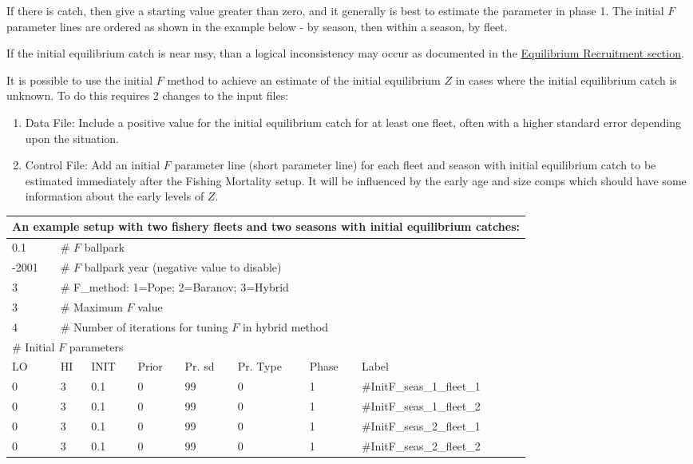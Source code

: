 If there is catch, then give a starting value greater than zero, and it generally is best to estimate the parameter in phase 1. The initial $F$ parameter lines are ordered as shown in the example below - by season, then within a season, by fleet.

If the initial equilibrium catch is near \gls{msy}, than a logical inconsistency may occur as documented in the \hyperlink{EquilRecr}{Equilibrium Recruitment section}. 

It is possible to use the initial $F$ method to achieve an estimate of the initial equilibrium $Z$ in cases where the initial equilibrium catch is unknown. To do this requires 2 changes to the input files:
\begin{enumerate}
	\item Data File: Include a positive value for the initial equilibrium catch for at least one fleet, often with a higher standard error depending upon the situation.
	\item Control File: Add an initial $F$ parameter line (short parameter line) for each fleet and season with initial equilibrium catch to be estimated immediately after the Fishing Mortality setup. It will be influenced by the early age and size comps which should have some information about the early levels of $Z$.
\end{enumerate}

\begin{longtable}{p{1.3cm} p{1cm} p{1cm} p{1cm} p{1.5cm} p{1.2cm} p{1cm} p{2.5cm}}
	\multicolumn{8}{l}{An example setup with two fishery fleets and two seasons with initial equilibrium catches:} \\
	\hline
	0.1 & \multicolumn{7}{l}{\# $F$ ballpark} \Tstrut\Bstrut\\
	\hline
	-2001 & \multicolumn{7}{l}{\# $F$ ballpark year (negative value to disable)} \Tstrut\Bstrut\\
	\hline
	3 & \multicolumn{7}{l}{\# F\_method: 1=Pope; 2=Baranov; 3=Hybrid} \Tstrut\Bstrut\\
	\hline
	3 & \multicolumn{7}{l}{\# Maximum $F$ value} \Tstrut\Bstrut\\
	\hline
	4 & \multicolumn{7}{l}{\# Number of iterations for tuning $F$ in hybrid method} \Tstrut\Bstrut\\
	\hline
	\multicolumn{8}{l}{\# Initial $F$ parameters} \Tstrut\Bstrut\\
	LO & HI & INIT & Prior & Pr. \gls{sd} & Pr. Type & Phase & Label \Bstrut\\
	\hline
	0 & 3 & 0.1 & 0 & 99 & 0 & 1 & \#InitF\_seas\_1\_fleet\_1 \Tstrut\\
	\hline
	0 & 3 & 0.1 & 0 & 99 & 0 & 1 & \#InitF\_seas\_1\_fleet\_2 \Tstrut\\
	\hline
	0 & 3 & 0.1 & 0 & 99 & 0 & 1 & \#InitF\_seas\_2\_fleet\_1 \Tstrut\\
	\hline
	0 & 3 & 0.1 & 0 & 99 & 0 & 1 & \#InitF\_seas\_2\_fleet\_2 \Tstrut\\
	\hline
\end{longtable}


